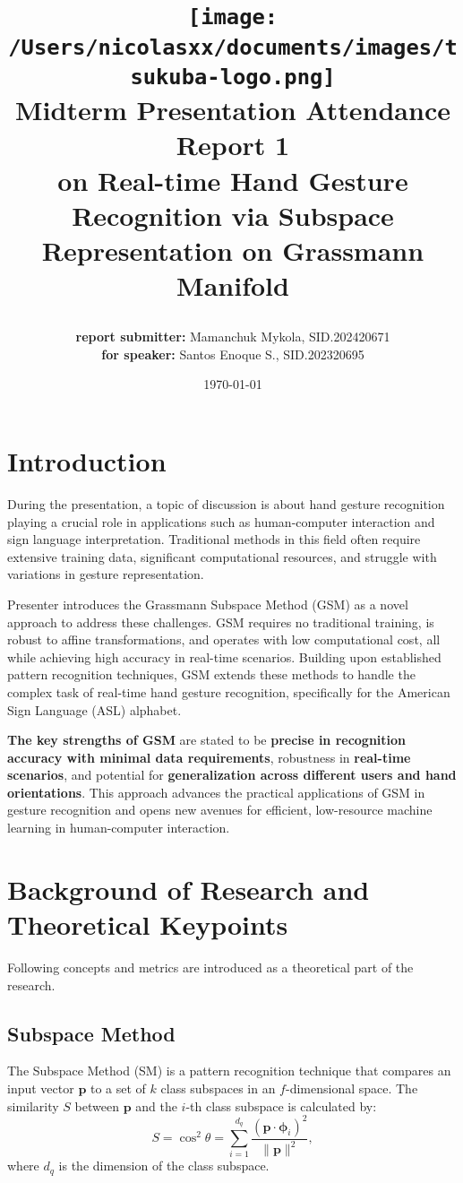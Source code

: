 \documentclass[12pt,a4paper]{article}
\title{
    \texttt{[image: /Users/nicolasxx/documents/images/tsukuba-logo.png]} \\
    \textbf{Midterm Presentation Attendance} \\
    \vspace{3mm}    
    Report 1 \\
    on Real-time Hand Gesture Recognition via Subspace Representation
    on Grassmann Manifold

\author{\textbf{report submitter: }Mamanchuk Mykola, SID.202420671 \\
\textbf{      for speaker: }Santos Enoque S., SID.202320695}
\date{\today}
}
\begin{document}
\maketitle


\section{Introduction}
During the presentation, a topic of discussion is about hand gesture recognition playing a crucial role in applications such as human-computer interaction and sign language interpretation. Traditional methods in this field often require extensive training data, significant computational resources, and struggle with variations in gesture representation. 

Presenter introduces the Grassmann Subspace Method (GSM) as a novel approach to address these challenges. GSM requires no traditional training, is robust to affine transformations, and operates with low computational cost, all while achieving high accuracy in real-time scenarios. Building upon established pattern recognition techniques, GSM extends these methods to handle the complex task of real-time hand gesture recognition, specifically for the American Sign Language (ASL) alphabet. 

\textbf{The key strengths of GSM} are stated to be \textbf{precise in recognition accuracy with minimal data requirements}, robustness in \textbf{real-time scenarios}, and potential for \textbf{generalization across different users and hand orientations}. This approach advances the practical applications of GSM in gesture recognition and opens new avenues for efficient, low-resource machine learning in human-computer interaction.

\section{Background of Research and Theoretical Keypoints}

Following concepts and metrics are introduced as a theoretical part of the research.

\subsection{Subspace Method}
The Subspace Method (SM) is a pattern recognition technique that compares an input vector $\mathbf{p}$ to a set of $k$ class subspaces in an $f$-dimensional space. The similarity $S$ between $\mathbf{p}$ and the $i$-th class subspace is calculated by:
\[
S = \cos^2 \theta = \sum_{i=1}^{d_q} \frac{(\mathbf{p} \cdot \boldsymbol{\phi}_i)^2}{\|\mathbf{p}\|^2},
\]
where $d_q$ is the dimension of the class subspace.
\end{document}
